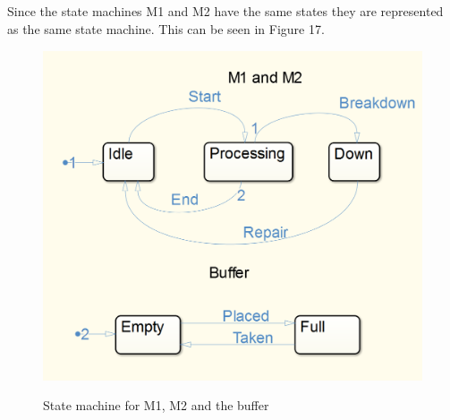 \documentclass[12pt,a4paper]{article}
\begin{document}
\subsection{}
Since the state machines M1 and M2 have the same states they are represented as the same state machine. This can be seen in Figure 17.	
\begin{center}
	\begin{figure}[H]
      \centering
	\includegraphics[scale=0.5]{des1.png}
	\label{fig:des1}
	\caption{State machine for M1, M2 and the buffer}
	\end{figure}
\end{center}
\end{document}
